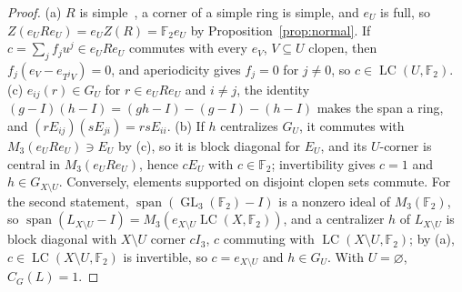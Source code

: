 \documentclass[11pt]{amsart}
\theoremstyle{remark}
\newcommand{\F}{\mathbb F}
\newcommand{\LC}{\operatorname{LC}}
\newcommand{\GL}{\operatorname{GL}}
\begin{document}
\begin{proof}
(a) $R$ is simple~\cite[Corollary~4.6]{ClarkEdie}, a corner of a simple
ring is simple, and $e_U$ is full, so $Z(e_URe_U)=e_UZ(R)=\F_2e_U$ by
Proposition~\ref{prop:normal}. If $c=\sum_jf_ju^j\in e_URe_U$ commutes
with every $e_V$, $V\subseteq U$ clopen, then
$f_j(e_V-e_{T^jV})=0$, and aperiodicity gives $f_j=0$ for $j\ne0$, so
$c\in\LC(U,\F_2)$.
(c) $e_{ij}(r)\in G_U$ for $r\in e_URe_U$ and $i\ne j$, the identity
$(g-I)(h-I)=(gh-I)-(g-I)-(h-I)$ makes the span a ring, and
$(rE_{ij})(sE_{ji})=rsE_{ii}$.
(b) If $h$ centralizes $G_U$, it commutes with $M_3(e_URe_U)\ni E_U$ by
(c), so it is block diagonal for $E_U$, and its $U$-corner is central in
$M_3(e_URe_U)$, hence $cE_U$ with $c\in\F_2$; invertibility gives $c=1$
and $h\in G_{X\setminus U}$. Conversely, elements supported on disjoint
clopen sets commute. For the second statement,
$\operatorname{span}(\GL_3(\F_2)-I)$ is a nonzero ideal of $M_3(\F_2)$, so
$\operatorname{span}(L_{X\setminus U}-I)=M_3(e_{X\setminus U}\LC(X,\F_2))$,
and a centralizer $h$ of $L_{X\setminus U}$ is block diagonal with
$X\setminus U$ corner $cI_3$, $c$ commuting with $\LC(X\setminus U,\F_2)$;
by (a), $c\in\LC(X\setminus U,\F_2)$ is invertible, so $c=e_{X\setminus U}$
and $h\in G_U$. With $U=\varnothing$, $C_G(L)=1$.
\end{proof}
\end{document}
